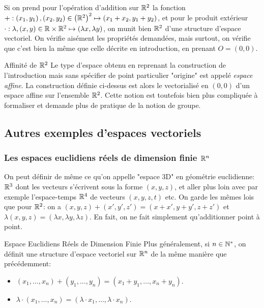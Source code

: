 \documentclass{classe}
\begin{document}
Si on prend pour l'opération d'addition sur $\mathbb{R}^{2}$ la fonction $+: \left( x_{1}, y_{1} \right), \left( x_{2}, y_{2} \right) \in \left(\mathbb{R}^{2}\right)^{2} \mapsto \left( x_{1} + x_{2}, y_{1} + y_{2} \right)$, et pour le produit extérieur $\cdot: \lambda, (x, y) \in \mathbb{R}\times \mathbb{R}^{2} \mapsto \left( \lambda x, \lambda y \right)$, on munit bien $\mathbb{R}^{2}$ d'une structure d'espace vectoriel.
On vérifie aisément les propriétés demandées, mais surtout, on vérifie que c'est bien la même que celle décrite en introduction, en prenant $O = \left( 0, 0 \right)$.

\begin{remarque}{Affinité de $\mathbb{R}^{2}$}{}
	Le type d'espace obtenu en reprenant la construction de l'introduction mais sans spécifier de point particulier "origine" est appelé \emph{espace affine}.
	La construction définie ci-dessus est alors le vectorialisé en $\left(0, 0\right)$ d'un espace affine sur l'ensemble $\mathbb{R}^{2}$.
	Cette notion est toutefois bien plus compliquée à formaliser et demande plus de pratique de la notion de groupe.
\end{remarque}

\subsection{Autres exemples d'espaces vectoriels}

\subsubsection{Les espaces euclidiens réels de dimension finie $\mathbb{R}^n$}

On peut définir de même ce qu'on appelle "espace 3D" en géométrie euclidienne: $\mathbb{R}^3$ dont les vecteurs s'écrivent sous la forme $(x, y, z)$, et aller plus loin avec par exemple l'espace-temps $\mathbb{R}^4$ de vecteurs $(x, y, z, t)$ etc. On garde les mêmes lois que pour $\mathbb{R}^2$: on a $(x, y, z) + (x', y', z') = (x+x', y+y', z+z')$ et $\lambda(x, y, z) = (\lambda x, \lambda y, \lambda z)$.
En fait, on ne fait simplement qu'additionner point à point.

\begin{définition}{Espace Euclidiens Réels de Dimension Finie}{}
	Plus généralement, si $n \in \mathbb{N}^{*}$, on définit une structure d'espace vectoriel sur $\mathbb{R}^{n}$ de la même manière que précédemment:
	\begin{itemize}
		\item $\left( x_{1}, \ldots, x_{n} \right) + \left( y_{1}, \ldots, y_{n} \right) = \left( x_{1} + y_{1}, \ldots, x_{n} + y_{n} \right)$.
		\item $\lambda \cdot \left( x_{1}, \ldots, x_{n} \right) = \left( \lambda \cdot x_{1}, \ldots, \lambda \cdot x_{n} \right)$.
	\end{itemize}
\end{définition}
\end{document}
